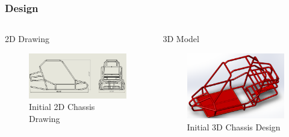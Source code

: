 \documentclass{beamer}
\begin{document}
\begin{frame}
	\frametitle{Design}
	\begin{columns}[T]
		\begin{column}{0.5\textwidth}
			\begin{block}{2D Drawing}
				\begin{figure}
				\includegraphics[scale=.16]{figures/chassis_model.pdf}
				\caption {Initial 2D Chassis Drawing}
				\end{figure}
			\end{block}
		\end{column}
		\begin{column}{0.5\textwidth}
			\begin{block}{3D Model}
				\begin{figure}
				\includegraphics[scale=.14]{figures/solidwork_model.pdf}
				\caption {Initial 3D Chassis Design}
				\end{figure}
			\end{block}
		\end{column}
	\end{columns}	
\end{frame}			
\end{document}
